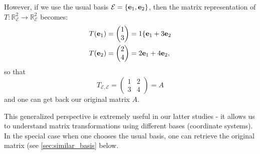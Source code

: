 \begin{example}
However, if we use the usual basis $\mathcal{E} = \{{\bf e}_1, {\bf e}_2\}$, then the matrix representation of $T: \mathbb{R}^2_{\mathcal{E}} \to \mathbb{R}^2_{\mathcal{E}}$ becomes:
    \begin{align*}T({\bf e}_1) &= \begin{pmatrix}
        1 \\ 3
    \end{pmatrix} = 1\{{\bf e}_1+ 3{\bf e}_2\\
    T({\bf e}_2) &= \begin{pmatrix}
        2 \\ 4
    \end{pmatrix} = 2{\bf e}_1+ 4{\bf e}_2,
    \end{align*}
so that 
$$T_{\mathcal{E},\mathcal{E}} = \begin{pmatrix}
        1 & 2 \\ 3 & 4
    \end{pmatrix} = A$$
and one can get back our original matrix $A$. 

This generalized perspective is extremely useful in our latter studies - it allows us to understand matrix transformations using different bases (coordinate systems). In the special case when one chooses the usual basis, one can retrieve the original matrix (see \autoref{sec:similar_basis} below.
\end{example}


